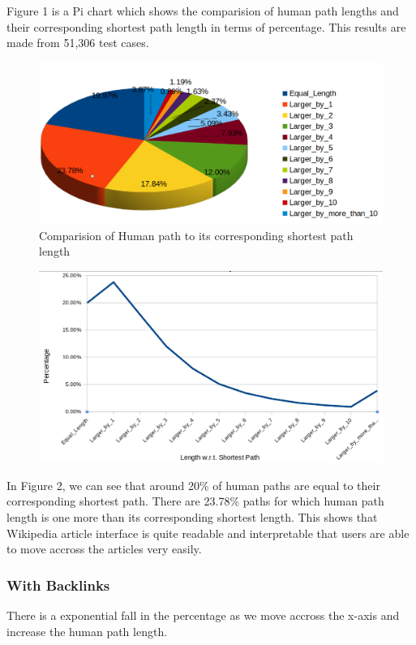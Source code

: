 \documentclass[12pt]{article}
\begin{document}
	Figure 1 is a Pi chart which shows the comparision of human path lengths and their corresponding shortest path length in terms of percentage. This results are made from 51,306 test cases.
\begin{figure}[h]
    \centering
    \hspace{-60pt}
    \includegraphics[scale = 0.47]{images/percentage_pi.png}
    \caption{Comparision of Human path to its corresponding shortest path length}
\end{figure}
\pagebreak

\begin{figure}[h]
    \centering
    \includegraphics[scale = 0.3]{images/percentage_path_line.png}
    \caption{}
\end{figure}

In Figure 2, we can see that around 20\% of human paths are equal to their corresponding shortest path. There are 23.78\% paths for which human path length is one more than its corresponding shortest length. This shows that Wikipedia article interface is quite readable and interpretable that users are able to move accross the articles very easily. 

\subsubsection{With Backlinks}
There is a exponential fall in the percentage as we move accross the x-axis and increase the human path length. 
\end{document}
